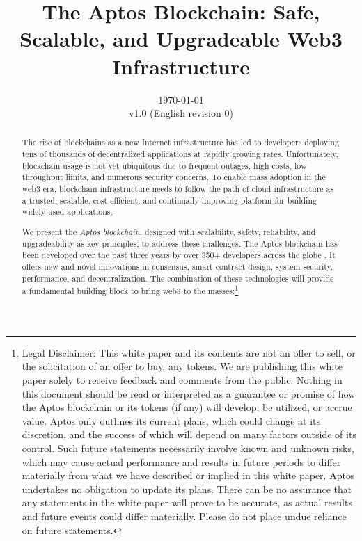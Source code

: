 \documentclass{article}
\title{The Aptos Blockchain: Safe, Scalable, and Upgradeable Web3 Infrastructure}
\author{}
\date{\today\\v1.0 (English revision 0)}
\begin{document}
\maketitle

\begin{abstract}
The rise of blockchains as a new Internet infrastructure has led to developers deploying tens of thousands of decentralized applications at rapidly growing rates. Unfortunately, blockchain usage is not yet ubiquitous due to frequent outages, high costs, low throughput limits, and numerous security concerns. To enable mass adoption in the web3 era, blockchain infrastructure needs to follow the path of cloud infrastructure as a trusted, scalable, cost-efficient, and continually improving platform for building widely-used applications. 
 
We present the \emph{Aptos blockchain}, designed with scalability, safety, reliability, and upgradeability as key principles, to address these challenges. The Aptos blockchain has been developed over the past three years by over 350+ developers across the globe \cite{aptos_core_github}. It offers new and novel innovations in consensus, smart contract design, system security, performance, and decentralization. The combination of these technologies will provide a fundamental building block to bring web3 to the masses:\footnote{Legal Disclaimer: This white paper and its contents are not an offer to sell, or the solicitation of an offer to buy, any tokens. We are publishing this white paper solely to receive feedback and comments from the public. Nothing in this document should be read or interpreted as a guarantee or promise of how the Aptos blockchain or its tokens (if any) will develop, be utilized, or accrue value. Aptos only outlines its current plans, which could change at its discretion, and the success of which will depend on many factors outside of its control. Such future statements necessarily involve known and unknown risks, which may cause actual performance and results in future periods to differ materially from what we have described or implied in this white paper. Aptos undertakes no obligation to update its plans. There can be no assurance that any statements in the white paper will prove to be accurate, as actual results and future events could differ materially. Please do not place undue reliance on future statements.}
 

\end{abstract}
\end{document}
